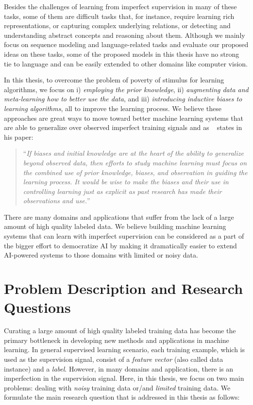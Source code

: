 Besides the challenges of learning from imperfect supervision in many of these tasks, some of them are difficult tasks that, for instance, require learning rich representations, or capturing complex underlying relations, or detecting and understanding abstract concepts and reasoning about them.
%
Although we mainly focus on sequence modeling and language-related tasks and evaluate our proposed ideas on these tasks, some of the proposed models in this thesis have no strong tie to language and can be easily extended to other domains like computer vision.

\medskip
In this thesis, to overcome the problem of poverty of stimulus for learning algorithms, we focus on  i) \emph{employing the prior knowledge}, ii) \emph{augmenting data and meta-learning how to better use the data}, and iii) \emph{introducing inductive biases to learning algorithms}, all to improve the learning process. We believe these approaches are great ways to move toward better machine learning systems that are able to generalize over observed imperfect training signals and as ~\citet{Mitchell80theneed} states in his paper:
\begin{quote}
``\emph{If biases and initial knowledge are at the heart of the ability to generalize beyond observed data, then efforts to study machine learning must focus on the combined use of prior knowledge, biases, and observation in guiding the learning process. It would be wise to make the biases and their use in controlling learning just as explicit as past research has made their observations and use.}''
\end{quote}
There are many domains and applications that suffer from the lack of a large amount of high quality labeled data. We believe building machine learning systems that can learn with imperfect supervision can be considered as a part of the bigger effort to democratize AI by making it dramatically easier to extend AI-powered systems to those domains with limited or noisy data.



\section{Problem Description and Research Questions}
Curating a large amount of high quality labeled training data has become the primary bottleneck in developing new methods and applications in machine learning. 
In general supervised learning scenario, each training example, which is used as the supervision signal, consist of a \emph{feature vector} (also called data instance) and a \emph{label}. However, in many domains and application, there is an imperfection in the supervision signal. Here, in this thesis, we focus on two main problems: dealing with \emph{noisy} training data or/and \emph{limited} training data. 
We formulate the main research question that is addressed in this thesis as follows:

